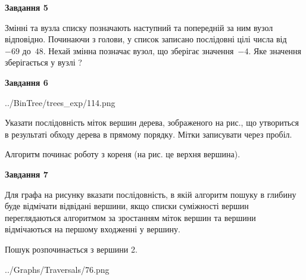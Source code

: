 \documentclass[12pt, ukrainian]{article}
\begin{document}
{\begin {large}
{\begin {center}\textbf{Завдання 5}\end {center}}\par
Змінні  та  вузла списку позначають наступний та попередній за ним вузол відповідно. Починаючи з голови, у список записано послідовні цілі числа від~$-69$ до~$48$. Нехай змінна  позначає вузол, що зберігає значення~$-4$.
Яке значення зберігається у вузлі  ?\par
\newpage

{\begin {center}\textbf{Завдання 6}\end {center}}\par

\begin{center}
	{../BinTree/trees_exp/114.png}
\end{center}
Указати послідовність міток вершин дерева, зображеного на рис., що утвориться в результаті обходу дерева в прямому порядку. Мітки записувати через пробіл.\par Алгоритм починає роботу з кореня (на рис. це верхня вершина).\par
\newpage

{\begin {center}\textbf{Завдання 7}\end {center}}\par
Для графа на рисунку вказати послідовність, в якій алгоритм пошуку в глибину буде відмічати відвідані вершини, якщо списки суміжності вершин переглядаються алгоритмом за зростанням міток вершин та вершини відмічаються на першому вход\-женні у вершину.\par
Пошук розпочинається з вершини 2.\par

\begin{center}
	{../Graphs/Traversals/76.png}
\end{center}\par
\newpage


\end{large}}
\end{document}
